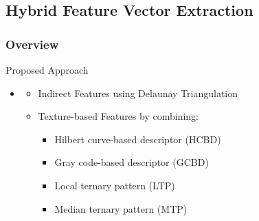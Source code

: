 \subsection{Hybrid Feature Vector Extraction}
\subsubsection{Overview}
\begin{frame}[t]{Proposed Approach}
	\topline
    \begin{itemize}
    	\item \textcolor{navy_theme}{\textbf{\subsecname}}
    	\vspace{1em}
		\begin{itemize}
			\setlength\itemsep{1em}
			\item Indirect Features using Delaunay Triangulation \cite{lee1980two}
			\item Texture-based Features by combining:
			\vspace{0.75em}
			\begin{itemize}
				\setlength\itemsep{0.75em}
				\item Hilbert curve-based descriptor (HCBD) \cite{Ebrahim2009hcbd}
				\item Gray code-based descriptor (GCBD) \cite{Zhao2008gcbd}
				\item Local ternary pattern (LTP) \cite{tan2010enhanced} 
				\item Median ternary pattern (MTP) \cite{bashar2014robust}
			\end{itemize}
		\end{itemize}
	\end{itemize}
\end{frame}

